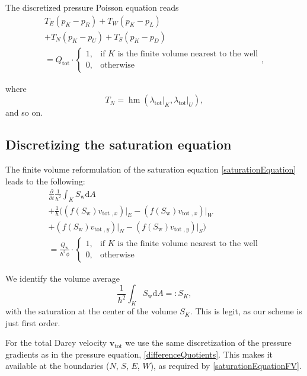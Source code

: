 \documentclass[twoside]{IEEEtran}
\renewcommand*{\d}[1]{\ensuremath{\mathrm{d}#1}}
\newcommand*{\pdiff}[2]{\ensuremath{\frac{\partial}{\partial{#2}}{#1}}}
\renewcommand*{\vec}[1]{\ensuremath{{\bm{#1}}}}
\DeclareMathOperator*{\hmean}{hm}
\begin{document}
The discretized pressure Poisson equation reads
\begin{multline}
T_E (p_K - p_R) + T_W (p_K - p_L) \\+ T_N ( p_K - p_U) + T_S (p_K - p_D) \\= {Q_\text{tot}} \cdot \begin{cases} 1, &\text{if } K \text{ is the finite volume nearest to the well} \\
0, & \text{otherwise} \end{cases},
\end{multline}

where \begin{equation}
T_N = \hmean(\lambda_\text{tot}\lvert_K, \lambda_\text{tot}\lvert_U),
\end{equation}
and so on.

\subsection{Discretizing the saturation equation}
\label{discSaturationEquation}
The finite volume reformulation of the saturation equation \eqref{saturationEquation} leads to the following:
\begin{multline}
\label{saturationEquationFV}
\pdiff{\frac{1}{h^2} \int_K S_\text{w} \d{A}}{t} \\+ \frac{1}{h}\biggr((f(S_\text{w})v_{\text{tot }, x})\lvert_E - (f(S_\text{w})v_{\text{tot }, x})\lvert_W \\+ (f(S_\text{w})v_{\text{tot }, y})\lvert_N - (f(S_\text{w})v_{\text{tot }, y})\lvert_S\biggr) \\=
\frac{Q_\text{w}}{h^2 \phi} \cdot \begin{cases} 1, &\text{if } K \text{ is the finite volume nearest to the well} \\0, &\text{otherwise}\end{cases}
\end{multline}

We identify the volume average
\begin{equation}
\frac{1}{h^2} \int_K S_\text{w} \d{A} =: S_K,
\end{equation}
with the saturation at the center of the volume $S_K$. This is legit, as our scheme is just first order.

For the total Darcy velocity $\vec{v}_\text{tot}$ we use the same discretization of the pressure gradients as in the pressure equation, \eqref{differenceQuotients}.
This makes it available at the boundaries ($N$, $S$, $E$, $W$), as required by \eqref{saturationEquationFV}.
\end{document}
